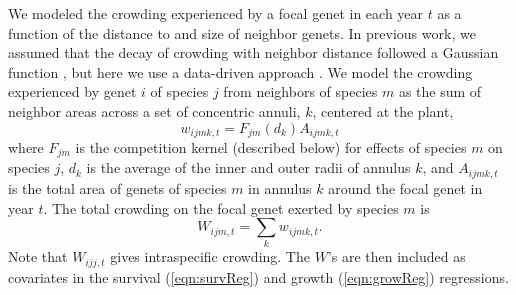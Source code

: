 \documentclass[11pt]{article}
\begin{document}
We modeled the crowding experienced by a focal genet in each year $t$ as a function of the distance to and size of neighbor genets. In previous work, 
we assumed that the decay of crowding with neighbor distance followed a Gaussian function \citep{chu_large_2015}, but here we use a data-driven 
approach \citep{teller_linking_2016}. We model the crowding experienced by genet $i$ of species $j$ from neighbors of species $m$ as the sum of neighbor 
areas across a set of concentric annuli, $k$, centered at the plant,
\begin{equation}
w_{ijmk,t} = F_{jm}(d_{k})A_{ijmk,t}     
\label{eqn:wik}
\end{equation}
where $F_{jm}$ is the competition kernel (described below) for effects of species $m$ on species $j$, 
$d_{k}$ is the average of the inner and outer radii of annulus $k$, 
and $A_{ijmk,t}$ is the total area of genets of species $m$ in annulus $k$ around the focal genet in year $t$. The total crowding on 
the focal genet exerted by species $m$ is
\begin{equation}
W_{ijm,t}  =\sum_k {w_{ijmk,t}} .
\label{eqn:wijm}
\end{equation} 
Note that $W_{ijj,t}$ gives intraspecific crowding. The $W$'s are then 
included as covariates in the survival (\ref{eqn:survReg}) and growth (\ref{eqn:growReg}) regressions.
\end{document}
